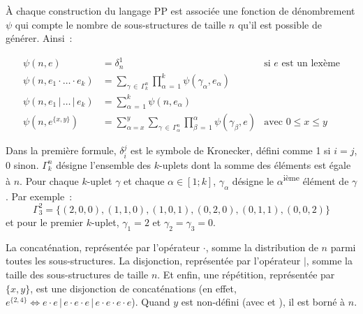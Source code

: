 À chaque construction du langage PP est associée une fonction de dénombrement
$\psi$ qui compte le nombre de sous-structures de taille $n$ qu'il est possible
de générer. Ainsi~:

\begin{align*}
%
\psi(n, e) & =
    \delta_n^1
    &
    \text{si $e$ est un lexème}
    \\
%
\psi(n, e_1 \cdot \dotso \cdot e_k) & =
    \sum_{\gamma \,\in\, \Gamma_k^n}
    \prod_{\alpha \,=\, 1}^k
    \psi(\gamma_\alpha, e_\alpha)
    \\
%
\psi(n, e_1 \,\vert\, \dots \,\vert\, e_k) & =
    \sum_{\alpha \,=\, 1}^k
    \psi(n, e_\alpha)
    \\
%
\psi(n, e^{\{x, y\}}) & =
    \sum_{\alpha = x}^y
    \sum_{\gamma \,\in\, \Gamma_\alpha^n}
    \prod_{\beta \,=\, 1}^\alpha
    \psi(\gamma_\beta, e)
    &
    \text{avec $0 \leq x \leq y$}
%
\end{align*}

Dans la première formule, $\delta_i^j$ est le symbole de Kronecker, défini
comme 1 si $i = j$, 0 sinon. $\Gamma_k^n$ désigne l'ensemble des $k$-uplets dont
la somme des éléments est égale à $n$. Pour chaque $k$-uplet $\gamma$ et chaque
$\alpha \in [1; k]$, $\gamma_\alpha$ désigne le $\alpha$\textsuperscript{ième}
élément de $\gamma$.
%
Par exemple~:
%
$$\Gamma_3^2 = \{(2, 0, 0), (1, 1, 0), (1, 0, 1), (0, 2, 0), (0, 1, 1), (0, 0,
2)\}$$
%
et pour le premier $k$-uplet, $\gamma_1 = 2$ et $\gamma_2 = \gamma_3 = 0$.

La concaténation, représentée par l'opérateur $\cdot$, somme la distribution de
$n$ parmi toutes les sous-structures. La disjonction, représentée par
l'opérateur $\vert$, somme la taille des sous-structures de taille $n$. Et
enfin, une répétition, représentée par $\{x, y\}$, est une disjonction de
concaténations (en effet, $e^{\{2,4\}} \Longleftrightarrow e \cdot e \,\vert\, e
\cdot e \cdot e \,\vert\, e \cdot e \cdot e \cdot e$). Quand $y$ est non-défini
(avec \code{*} et \code{+}), il est borné à $n$.

